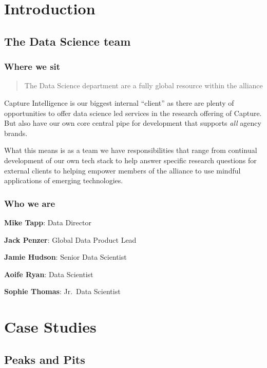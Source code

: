 \documentclass[
  letterpaper,
  DIV=11,
  numbers=noendperiod]{scrreprt}
\begin{document}
\part{Introduction}

\chapter{The Data Science team}\label{the-data-science-team}

\section{Where we sit}\label{where-we-sit}

\begin{quote}
The Data Science department are a fully global resource within the
alliance
\end{quote}

Capture Intelligence is our biggest internal ``client'' as there are
plenty of opportunities to offer data science led services in the
research offering of Capture. But also have our own core central pipe
for development that supports \emph{all} agency brands.

What this means is as a team we have responsibilities that range from
continual development of our own tech stack to help answer specific
research questions for external clients to helping empower members of
the alliance to use mindful applications of emerging technologies.

\section{Who we are}\label{who-we-are}

\textbf{Mike Tapp}: Data Director

\textbf{Jack Penzer}: Global Data Product Lead

\textbf{Jamie Hudson}: Senior Data Scientist

\textbf{Aoife Ryan}: Data Scientist

\textbf{Sophie Thomas}: Jr.~Data Scientist

\part{Case Studies}

\chapter{Peaks and Pits}\label{peaks-and-pits}
\end{document}
